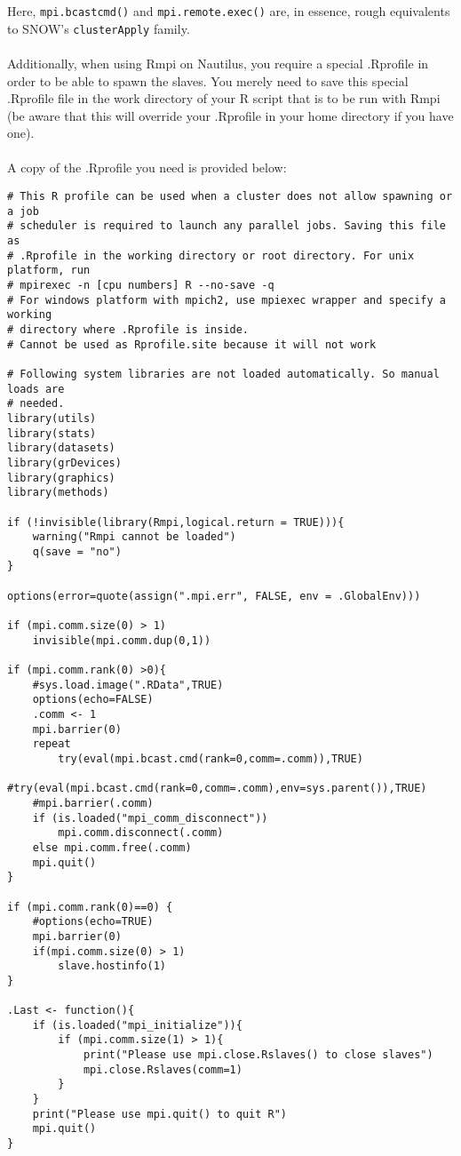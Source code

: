 Here, \texttt{mpi.bcastcmd()} and \texttt{mpi.remote.exec()} are, in essence, rough equivalents to SNOW's \texttt{clusterApply} family.\\\\
%
Additionally, when using Rmpi on Nautilus, you require a special .Rprofile in order to be able to spawn the slaves.  You merely need to save this special .Rprofile file in the work directory of your R script that is to be run with Rmpi (be aware that this will override your .Rprofile in your home directory if you have one).\\\\
%
A copy of the .Rprofile you need is provided below:
\begin{lstlisting}[language=rr]
# This R profile can be used when a cluster does not allow spawning or a job 
# scheduler is required to launch any parallel jobs. Saving this file as 
# .Rprofile in the working directory or root directory. For unix platform, run
# mpirexec -n [cpu numbers] R --no-save -q
# For windows platform with mpich2, use mpiexec wrapper and specify a working 
# directory where .Rprofile is inside.
# Cannot be used as Rprofile.site because it will not work

# Following system libraries are not loaded automatically. So manual loads are 
# needed.
library(utils)
library(stats)
library(datasets)
library(grDevices)
library(graphics)
library(methods)

if (!invisible(library(Rmpi,logical.return = TRUE))){
    warning("Rmpi cannot be loaded")
    q(save = "no")
}

options(error=quote(assign(".mpi.err", FALSE, env = .GlobalEnv)))

if (mpi.comm.size(0) > 1)
    invisible(mpi.comm.dup(0,1))

if (mpi.comm.rank(0) >0){
    #sys.load.image(".RData",TRUE)
    options(echo=FALSE)
    .comm <- 1
    mpi.barrier(0)
    repeat 
        try(eval(mpi.bcast.cmd(rank=0,comm=.comm)),TRUE)
        #try(eval(mpi.bcast.cmd(rank=0,comm=.comm),env=sys.parent()),TRUE)
    #mpi.barrier(.comm)
    if (is.loaded("mpi_comm_disconnect")) 
        mpi.comm.disconnect(.comm)
    else mpi.comm.free(.comm)
    mpi.quit()
}
    
if (mpi.comm.rank(0)==0) {
    #options(echo=TRUE)
    mpi.barrier(0)
    if(mpi.comm.size(0) > 1)
        slave.hostinfo(1)
}

.Last <- function(){
    if (is.loaded("mpi_initialize")){
        if (mpi.comm.size(1) > 1){
            print("Please use mpi.close.Rslaves() to close slaves")
            mpi.close.Rslaves(comm=1)
        }
    }
    print("Please use mpi.quit() to quit R")
    mpi.quit()
}
\end{lstlisting}


